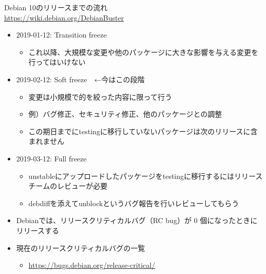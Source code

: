 \documentclass[mingoth,a4paper]{jsarticle}
\begin{document}


Debian 10のリリースまでの流れ \\
\url{https://wiki.debian.org/DebianBuster}
  
\begin{itemize}
\item 2019-01-12: Transition freeze
  \begin{itemize}
  \item これ以降、大規模な変更や他のパッケージに大きな影響を与える変更を行ってはいけない
  \end{itemize}
\item 2019-02-12: Soft freeze　←今はこの段階
  \begin{itemize}
  \item 変更は小規模で的を絞った内容に限って行う
  \item 例）バグ修正、セキュリティ修正、他のパッケージとの調整
  \item この期日までにtestingに移行していないパッケージは次のリリースに含まれません
  \end{itemize}
\item 2019-03-12: Full freeze
  \begin{itemize}
  \item unstableにアップロードしたパッケージをtestingに移行するにはリリースチームのレビューが必要
  \item debdiffを添えてunblockというバグ報告を行いレビューしてもらう
  \end{itemize}
\end{itemize}

\begin{itemize}
\item Debianでは、リリースクリティカルバグ（RC bug）が 0 個になったときにリリースする
\item 現在のリリースクリティカルバグの一覧
  \begin{itemize}
  \item \url{https://bugs.debian.org/release-critical/}
  \end{itemize}
\end{itemize}
\end{document}
